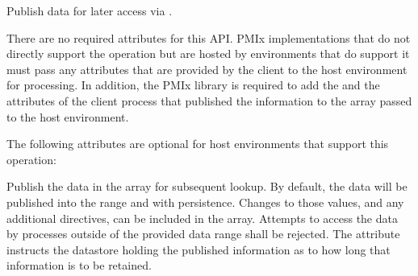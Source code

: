 \summary

Publish data for later access via .

\format


\begin{arglist}
\end{arglist}

\returnsimple

\reqattrstart
There are no required attributes for this \ac{API}. \ac{PMIx} implementations that do not directly support the operation but are hosted by environments that do support it must pass any attributes that are provided by the client to the host environment for processing. In addition, the \ac{PMIx} library is required to add the  and the  attributes of the client process that published the information to the  array passed to the host environment.

\reqattrend

\optattrstart
The following attributes are optional for host environments that support this operation:


\optattrend

\descr

Publish the data in the  array for subsequent lookup.
By default, the data will be published into the  range and with  persistence.
Changes to those values, and any additional directives, can be included in the  array. Attempts to access the data by processes outside of the provided data range shall be rejected. The  attribute instructs the datastore holding the published information as to how long that information is to be retained.

